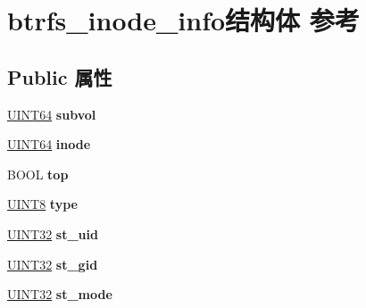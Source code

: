 \hypertarget{structbtrfs__inode__info}{}\section{btrfs\+\_\+inode\+\_\+info结构体 参考}
\label{structbtrfs__inode__info}
\subsection*{Public 属性}
\begin{DoxyCompactItemize}
\item 
\mbox{\label{structbtrfs__inode__info_a829c5a85a945e293b65902658bcf9591}} 
\hyperlink{_processor_bind_8h_a57be03562867144161c1bfee95ca8f7c}{U\+I\+N\+T64} {\bfseries subvol}
\item 
\mbox{\label{structbtrfs__inode__info_a37abc5809761faf8af337071f53ddba4}} 
\hyperlink{_processor_bind_8h_a57be03562867144161c1bfee95ca8f7c}{U\+I\+N\+T64} {\bfseries inode}
\item 
\mbox{\label{structbtrfs__inode__info_ae50efbcd7a1116add88620ba4664bc65}} 
B\+O\+OL {\bfseries top}
\item 
\mbox{\label{structbtrfs__inode__info_aa9b8a6931ae2e3918a1e7c031cb1f755}} 
\hyperlink{_processor_bind_8h_ab27e9918b538ce9d8ca692479b375b6a}{U\+I\+N\+T8} {\bfseries type}
\item 
\mbox{\label{structbtrfs__inode__info_a27c1d0cdd8af2798168a171b29daa9c3}} 
\hyperlink{_processor_bind_8h_ae1e6edbbc26d6fbc71a90190d0266018}{U\+I\+N\+T32} {\bfseries st\+\_\+uid}
\item 
\mbox{\label{structbtrfs__inode__info_a5ddd66f07ba093681150885b8e02148b}} 
\hyperlink{_processor_bind_8h_ae1e6edbbc26d6fbc71a90190d0266018}{U\+I\+N\+T32} {\bfseries st\+\_\+gid}
\item 
\mbox{\label{structbtrfs__inode__info_ae283458e2851f4e798bc8256fa77e698}} 
\hyperlink{_processor_bind_8h_ae1e6edbbc26d6fbc71a90190d0266018}{U\+I\+N\+T32} {\bfseries st\+\_\+mode}
\item 

\end{DoxyCompactItemize}
